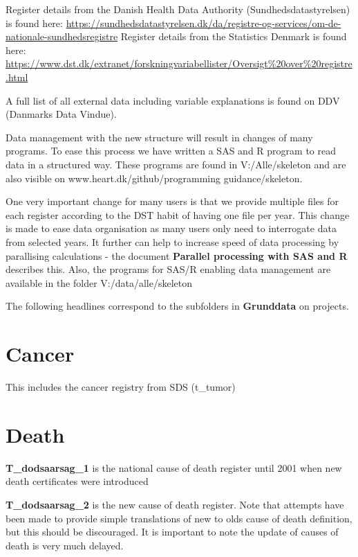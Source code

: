 \documentclass[
]{article}
\begin{document}
Register details from the Danish Health Data Authority
(Sundhedsdatastyrelsen) is found here:
\url{https://sundhedsdatastyrelsen.dk/da/registre-og-services/om-de-nationale-sundhedsregistre}
Register details from the Statistics Denmark is found here:
\url{https://www.dst.dk/extranet/forskningvariabellister/Oversigt\%20over\%20registre.html}

A full list of all external data including variable explanations is
found on DDV (Danmarks Data Vindue).

Data management with the new structure will result in changes of many
programs. To ease this process we have written a SAS and R program to
read data in a structured way. These programs are found in
V:/Alle/skeleton and are also visible on www.heart.dk/github/programming
guidance/skeleton.

One very important change for many users is that we provide multiple
files for each register according to the DST habit of having one file
per year. This change is made to ease data organisation as many users
only need to interrogate data from selected years. It further can help
to increase speed of data processing by parallising calculations - the
document \textbf{Parallel processing with SAS and R} describes this.
Also, the programs for SAS/R enabling data management are available in
the folder V:/data/alle/skeleton

The following headlines correspond to the subfolders in
\textbf{Grunddata} on projects.

\hypertarget{cancer}{%
\section{Cancer}\label{cancer}}

This includes the cancer registry from SDS (t\_tumor)

\hypertarget{death}{%
\section{Death}\label{death}}

\textbf{T\_dodsaarsag\_1} is the national cause of death register until
2001 when new death certificates were introduced

\textbf{T\_dodsaarsag\_2} is the new cause of death register. Note that
attempts have been made to provide simple translations of new to olds
cause of death definition, but this should be discouraged. It is
important to note the update of causes of death is very much delayed.
\end{document}
